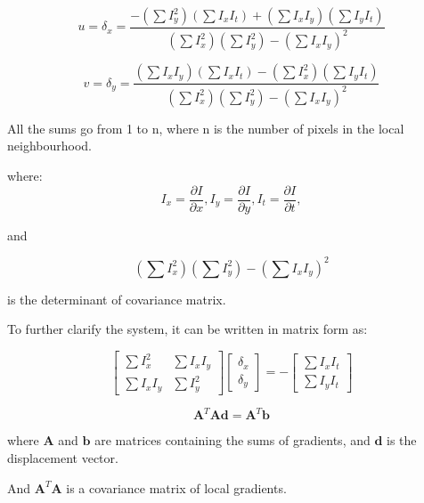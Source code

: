 \documentclass{article}
\begin{document}
\begin{multicols}{2}
	\[
		u = \delta_x = \frac{-\left( \sum I_y^2 \right) \left( \sum I_x I_t \right) + \left( \sum I_x I_y \right)\left( \sum I_y I_t \right)}{\left( \sum I_x^2 \right) \left( \sum I_y^2 \right) - \left( \sum I_x I_y \right)^2}
	\]

	\[
		v = \delta_y = \frac{\left( \sum I_x I_y \right) \left( \sum I_x I_t \right) - \left( \sum I_x^2 \right)\left( \sum I_y I_t \right)}{\left( \sum I_x^2 \right) \left( \sum I_y^2 \right) - \left( \sum I_x I_y \right)^2}
	\]

	All the sums go from 1 to n, where n is the number of pixels in the local neighbourhood.

	where:
	\[
		I_x = \frac{\partial I}{\partial x},
		I_y = \frac{\partial I}{\partial y},
		I_t = \frac{\partial I}{\partial t},
	\]

	and

	\[
		\left( \sum I_x^2 \right) \left( \sum I_y^2 \right) - \left( \sum I_x I_y \right)^2
	\]

	is the determinant of covariance matrix.

	To further clarify the system, it can be written in matrix form as:

	\[
		\left[ \begin{array}{cc}
				\sum I_x^2   & \sum I_x I_y \\
				\sum I_x I_y & \sum I_y^2
			\end{array} \right]
		\left[ \begin{array}{c}
				\delta_x \\
				\delta_y
			\end{array} \right]
		=
		-\left[ \begin{array}{c}
				\sum I_x I_t \\
				\sum I_y I_t
			\end{array} \right]
	\]

	\[
		\mathbf{A}^T \mathbf{A} \mathbf{d} = \mathbf{A}^T \mathbf{b}
	\]

	where \(\mathbf{A}\) and \(\mathbf{b}\) are matrices containing the sums of gradients, and \(\mathbf{d}\) is the displacement vector.

	And \(\mathbf{A}^T \mathbf{A} \) is a covariance matrix of local gradients.


\end{multicols}
\end{document}
